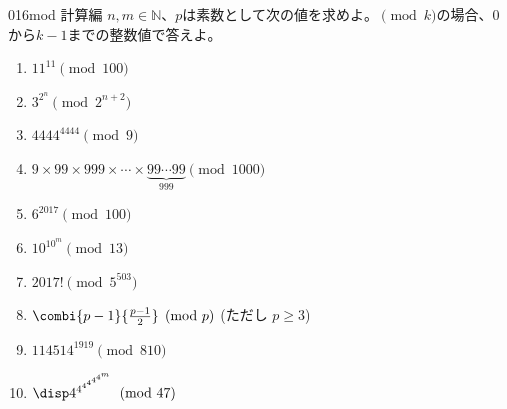 \begin{prob}{016}{}{mod 計算編}
 $n,m\in\mathbb{N}$、$p$は素数として次の値を求めよ。$\pmod k$の場合、$0$から$k-1$までの整数値で答えよ。
 \begin{enumerate}
  \item $11^{11} \pmod {100}$
  \item $3^{2^n} \pmod {2^{n+2}}$
  \item $4444^{4444} \pmod 9$
  \item $9\times99\times999\times\cdots\times\underbrace{99\cdots99}_{999} \pmod {1000}$
  \item $6^{2017} \pmod {100}$
  \item $10^{10^m} \pmod {13}$
  \item $2017! \pmod 5^{503}$
  \item $\combi{p-1}{\frac{p-1}{2}} \pmod{p}$ (ただし $p\ge 3$)
  \item $114514^{1919} \pmod {810}$
  \item $\disp 4^{4^{4^{4^{4^{4^m}}}}} \pmod {47}$
 \end{enumerate}
\end{prob}


